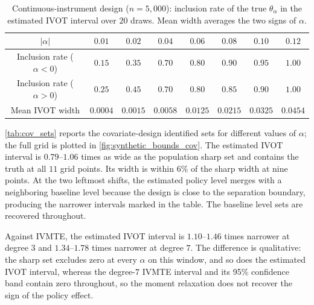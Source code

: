 \begin{table}[htbp]
\centering
\caption{Continuous-instrument design ($n=5{,}000$): inclusion rate of the true $\theta_\alpha$ in the estimated IVOT interval over $20$ draws. Mean width averages the two signs of $\alpha$.}
\label{tab:synthetic_inclusion_5000}
\renewcommand{\arraystretch}{1.3}
\begin{tabular}{cccccccc}
\toprule
$|\alpha|$ & $0.01$ & $0.02$ & $0.04$ & $0.06$ & $0.08$ & $0.10$ & $0.12$ \\
\midrule
Inclusion rate ($\alpha<0$) & $0.15$ & $0.35$ & $0.70$ & $0.80$ & $0.90$ & $0.95$ & $1.00$ \\
Inclusion rate ($\alpha>0$) & $0.25$ & $0.45$ & $0.70$ & $0.80$ & $0.85$ & $0.90$ & $1.00$ \\
Mean IVOT width & $0.0004$ & $0.0015$ & $0.0058$ & $0.0125$ & $0.0215$ & $0.0325$ & $0.0454$ \\
\bottomrule
\end{tabular}
\end{table}

\cref{tab:cov_sets} reports the covariate-design identified sets for different values of $\alpha$; the full grid is plotted in \cref{fig:synthetic_bounds_cov}. The estimated IVOT interval is $0.79$--$1.06$ times as wide as the population sharp set and contains the truth at all $11$ grid points. Its width is within $6\%$ of the sharp width at nine points. At the two leftmost shifts, the estimated policy level merges with a neighboring baseline level because the design is close to the separation boundary, producing the narrower intervals marked in the table. The baseline level sets are recovered throughout.

Against IVMTE, the estimated IVOT interval is $1.10$--$1.46$ times narrower at degree $3$ and $1.34$--$1.78$ times narrower at degree $7$. The difference is qualitative: the sharp set excludes zero at every $\alpha$ on this window, and so does the estimated IVOT interval, whereas the degree-$7$ IVMTE interval and its 95\% confidence band contain zero throughout, so the moment relaxation does not recover the sign of the policy effect.

